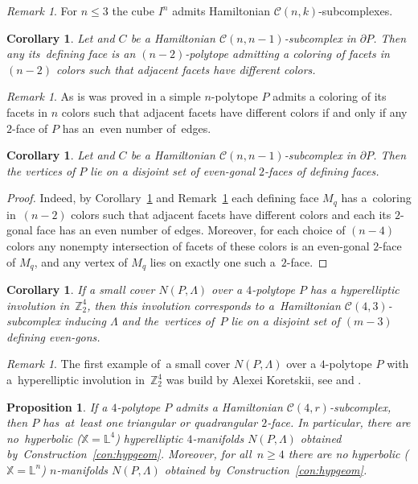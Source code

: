 \documentclass[12pt]{amsart}
\newtheorem{proposition}[formula]{Proposition}
\newtheorem{corollary}[formula]{Corollary}
\theoremstyle{definition}
\theoremstyle{remark}
\newtheorem{remark}[formula]{Remark}
\begin{document}
\begin{remark}
For $n\leqslant 3$ the cube $I^n$ admits Hamiltonian $\mathcal{C}(n,k)$-subcomplexes.
\end{remark}
\begin{corollary}\label{cor:n-2n-2}
Let and $C$ be a Hamiltonian $\mathcal{C}(n,n-1)$-subcomplex in $\partial P$.
Then any its~defining face is an $(n-2)$-polytope admitting a coloring of facets in $(n-2)$ colors
such that adjacent facets have different colors.  
\end{corollary}
\begin{remark}\label{rem:nn}
As is was proved in \cite{J01} a simple $n$-polytope $P$ admits a coloring of its facets in $n$
colors such that adjacent facets have different colors if and only if any $2$-face of $P$ has 
an~even number of~edges.
\end{remark}
\begin{corollary}\label{cor:nn-1}
Let and $C$ be a Hamiltonian $\mathcal{C}(n,n-1)$-subcomplex in $\partial P$. Then 
the vertices of $P$ lie on a disjoint set of even-gonal $2$-faces of defining faces.   
\end{corollary}
\begin{proof}
Indeed, by Corollary~\ref{cor:n-2n-2} and Remark~\ref{rem:nn} each defining face $M_q$ 
has a~coloring in~$(n-2)$ colors such that adjacent facets have different colors 
and each its $2$-gonal face has an even number of edges.
Moreover, for each choice of $(n-4)$ colors any nonempty intersection of facets of these colors
is an even-gonal $2$-face of $M_q$, and any vertex of $M_q$ lies on exactly one such a~$2$-face. 
\end{proof}
\begin{corollary}
If a small cover $N(P,\Lambda)$ over a $4$-polytope $P$ has a hyperelliptic involution in~$\mathbb Z_2^4$,
then this involution corresponds to a~Hamiltonian $\mathcal{C}(4,3)$-subcomplex inducing $\Lambda$
and the~vertices of~$P$ lie on a disjoint set of $(m-3)$ defining even-gons.
\end{corollary}
\begin{remark}
The first example of~a small cover $N(P,\Lambda)$ over a $4$-polytope $P$  with a~hyperelliptic involution in~$\mathbb Z_2^4$
was build by Alexei Koretskii, see \cite{K24B} and \cite{K24}.
\end{remark}
\begin{proposition}\label{prop:Ln}
If a $4$-polytope $P$ admits a Hamiltonian $\mathcal{C}(4,r)$-subcomplex, then $P$
has~at~least one triangular or quadrangular $2$-face. In particular, there are 
no~hyperbolic ($\mathbb X=\mathbb L^4$) hyperelliptic 
$4$-manifolds $N(P,\Lambda)$  obtained by~Construction~\ref{con:hypgeom}. Moreover,
for all~$n\geqslant 4$ there are no  hyperbolic ($\mathbb X=\mathbb L^n$) $n$-manifolds $N(P,\Lambda)$ obtained by~Construction~\ref{con:hypgeom}.
\end{proposition}
\end{document}
